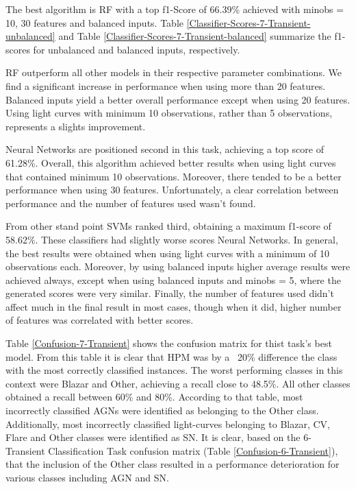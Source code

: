 \documentclass[a4paper,fleqn,usenatbib]{mnras}
\begin{document}
The best algorithm is RF with a top f1-Score of 66.39\% achieved with 
min\textunderscore obs = 10, 30 features and balanced inputs.
Table \ref{Classifier-Scores-7-Transient-unbalanced} and Table
\ref{Classifier-Scores-7-Transient-balanced} summarize the f1-scores
for unbalanced and balanced inputs, respectively. 

RF outperform all other models in their respective parameter
combinations. 
We find a significant increase in performance when using more than 20
features. 
Balanced inputs yield a better overall performance except when using 20 features. 
Using light curves with minimum 10 observations, rather than 5
observations, represents a slights improvement.

Neural Networks are positioned second in this task, achieving a top score of 61.28\%. Overall, this algorithm achieved better results when using light curves that contained minimum 10 observations. Moreover, there tended to be a better performance when using 30 features. Unfortunately, a clear correlation between performance and the number of features used wasn't found.

From other stand point SVMs ranked third, obtaining a maximum f1-score of 58.62\%. These classifiers had slightly worse scores Neural Networks. In general, the best results were obtained when using light curves with a minimum of 10 observations each. Moreover, by using balanced inputs higher average results were achieved always, except when using balanced inputs and min\textunderscore obs = 5, where the generated scores were very similar. Finally, the number of features used didn't affect much in the final result in most cases, though when it did, higher number of features was correlated with better scores.

Table \ref{Confusion-7-Transient} shows the confusion matrix for thist task's best model. From this table it is clear that HPM was by a ~20\% difference the class with the most correctly classified instances. The worst performing classes in this context were Blazar and Other, achieving a recall close to 48.5\%. All other classes obtained a recall between 60\% and 80\%. According to that table, most incorrectly classified AGNs were identified as belonging to the Other class. Additionally, most incorrectly classified light-curves belonging to Blazar, CV, Flare and Other classes were identified as SN. It is clear, based on the 6-Transient Classification Task confusion matrix (Table \ref{Confusion-6-Transient}), that the inclusion of the Other class resulted in a performance deterioration for various classes including AGN and SN.
\end{document}
